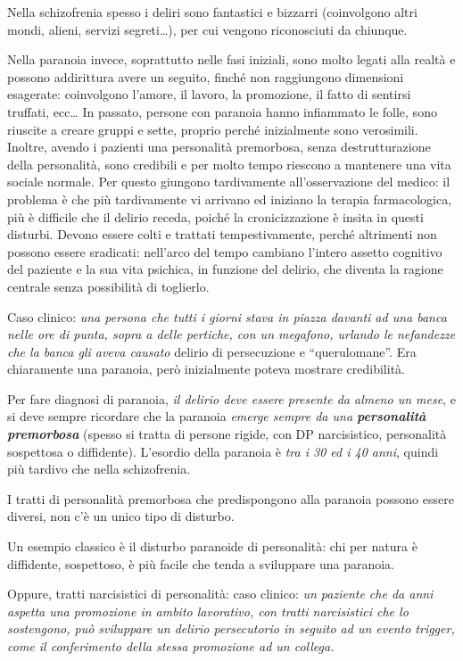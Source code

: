 Nella schizofrenia spesso i deliri sono fantastici e bizzarri
(coinvolgono altri mondi, alieni, servizi segreti\ldots{}), per cui
vengono riconosciuti da chiunque.

Nella paranoia invece, soprattutto nelle fasi iniziali, sono molto
legati alla realtà e possono addirittura avere un seguito, finché non
raggiungono dimensioni esagerate: coinvolgono l'amore, il lavoro, la
promozione, il fatto di sentirsi truffati, ecc\ldots{} In passato,
persone con paranoia hanno infiammato le folle, sono riuscite a creare
gruppi e sette, proprio perché inizialmente sono verosimili. Inoltre,
avendo i pazienti una personalità premorbosa, senza destrutturazione
della personalità, sono credibili e per molto tempo riescono a mantenere
una vita sociale normale. Per questo giungono tardivamente
all'osservazione del medico: il problema è che più tardivamente vi
arrivano ed iniziano la terapia farmacologica, più è difficile che il
delirio receda, poiché la cronicizzazione è insita in questi disturbi.
Devono essere colti e trattati tempestivamente, perché altrimenti non
possono essere sradicati: nell'arco del tempo cambiano l'intero assetto
cognitivo del paziente e la sua vita psichica, in funzione del delirio,
che diventa la ragione centrale senza possibilità di toglierlo.

Caso clinico: \emph{una persona che tutti i giorni stava in piazza
davanti ad una banca nelle ore di punta, sopra a delle pertiche, con un
megafono, urlando le nefandezze che la banca gli aveva causato} delirio
di persecuzione e ``querulomane''. Era chiaramente una paranoia, però
inizialmente poteva mostrare credibilità.

Per fare diagnosi di paranoia, \emph{il delirio deve essere presente da
almeno un mese}, e si deve sempre ricordare che la paranoia \emph{emerge
sempre da una \textbf{personalità premorbosa}} (spesso si tratta di
persone rigide, con DP narcisistico, personalità sospettosa o
diffidente). L'esordio della paranoia è \emph{tra i 30 ed i 40 anni},
quindi più tardivo che nella schizofrenia.

I tratti di personalità premorbosa che predispongono alla paranoia
possono essere diversi, non c'è un unico tipo di disturbo.

Un esempio classico è il disturbo paranoide di personalità: chi per
natura è diffidente, sospettoso, è più facile che tenda a sviluppare una
paranoia.

Oppure, tratti narcisistici di personalità: caso clinico: \emph{un
paziente che da anni aspetta una promozione in ambito lavorativo, con
tratti narcisistici che lo sostengono, può sviluppare un delirio
persecutorio in seguito ad un evento trigger, come il conferimento della
stessa promozione ad un collega. }

